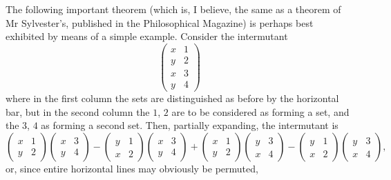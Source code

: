 \documentclass[11pt,a4paper]{article}
\theoremstyle{plain}
\begin{document}
The following important theorem (which is, I believe, the same as a theorem of Mr Sylvester's, published in the Philosophical Magazine) is perhaps best exhibited by means of a simple example. Consider the intermutant
\[\begin{pmatrix} x & 1 \\ y & 2 \\ \hline x & 3 \\ y & 4 \end{pmatrix}\]
where in the first column the sets are distinguished as before by the horizontal bar, but in the second column the $1$, $2$ are to be considered as forming a set, and the $3$, $4$ as forming a second set. Then, partially expanding, the intermutant is
\[\begin{pmatrix} x & 1 \\ y & 2 \end{pmatrix} \begin{pmatrix} x & 3 \\ y & 4 \end{pmatrix} - \begin{pmatrix} y & 1 \\ x & 2 \end{pmatrix} \begin{pmatrix} x & 3 \\ y & 4 \end{pmatrix} + \begin{pmatrix} x & 1 \\ y & 2 \end{pmatrix} \begin{pmatrix} y & 3 \\ x & 4 \end{pmatrix} - \begin{pmatrix} y & 1 \\ x & 2 \end{pmatrix} \begin{pmatrix} y & 3 \\ x & 4 \end{pmatrix},\]
or, since entire horizontal lines may obviously be permuted,
\end{document}
